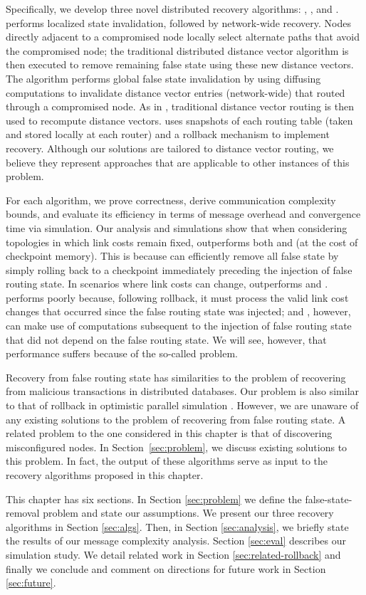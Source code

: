 Specifically, we develop three novel distributed recovery algorithms: \seconds, \purges, and \cprs. \second performs localized state invalidation, followed by network-wide recovery. 
Nodes directly adjacent to a compromised node locally select alternate paths that avoid the compromised node; the traditional distributed distance vector algorithm is then executed to 
remove remaining false state using these new distance vectors. The \purge algorithm performs global false state invalidation by using diffusing computations to invalidate distance vector 
entries (network-wide) that routed through a compromised node. As in \seconds, traditional distance vector routing is then used to recompute distance vectors. 
\cpr uses snapshots of each routing table (taken and stored locally at each router) and a rollback mechanism to implement recovery.
Although our solutions are tailored to distance vector routing, we believe they represent approaches that are applicable to other instances of this problem.

For each algorithm, we prove correctness, derive communication complexity bounds, and evaluate its efficiency in terms of message overhead and convergence time via simulation. 
Our analysis and simulations show that when considering topologies in which link costs remain fixed, \cpr outperforms both \purge and \second (at the cost of checkpoint memory). This is because \cpr can efficiently remove all false state by simply rolling back
to a checkpoint immediately preceding the injection of false routing state. In scenarios where link costs can change, \purge outperforms \cpr and \seconds. \cpr performs poorly because, following 
rollback, it must process the valid link cost changes that occurred since the false routing state was injected;  \second and \purges, however, can make use of computations subsequent to the 
injection of false routing state that did not depend on the false routing state. We will see, however, that \second performance suffers because of the so-called \infinity problem.


Recovery from false routing state has similarities to the problem of
recovering from malicious transactions \cite{Liu98, Liu00} in
distributed databases. Our problem is also similar to that of rollback
in optimistic parallel simulation \cite{Jeff}. However, we are unaware
of any existing solutions to the problem of recovering from false
routing state. A related problem to the one considered in this
chapter is that of discovering misconfigured nodes. In
Section~\ref{sec:problem}, we discuss existing solutions to this
problem. In fact, the output of these algorithms serve as input to the
recovery algorithms proposed in this chapter.

This chapter has six sections. In Section \ref{sec:problem} we define the false-state-removal problem and state our assumptions.
We present our three recovery algorithms in Section \ref{sec:algs}.  Then, in Section \ref{sec:analysis}, we briefly state the results of our message complexity analysis.
Section \ref{sec:eval} describes our simulation study. We detail related work in Section \ref{sec:related-rollback} and finally we conclude and 
comment on directions for future work in Section \ref{sec:future}.




